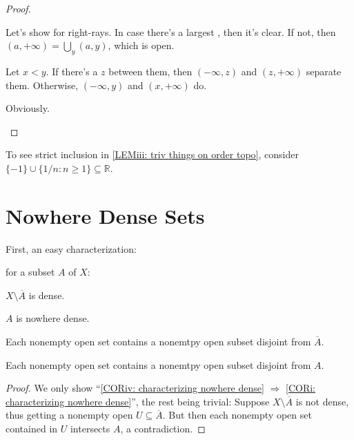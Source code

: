 	\begin{proof}
		\begin{mylist}
			\item Let's show for right-rays. In case there's a largest \elt, then it's clear. If not, then $(a, +\infty) = \bigcup_y (a, y)$, which is open.
			
			\item Let $x < y$. If there's a $z$ between them, then $(-\infty, z)$ and $(z, +\infty)$ separate them. Otherwise, $(-\infty, y)$ and $(x, +\infty)$ do.
			
			\item Obviously.\qedhere
		\end{mylist}
	\end{proof}
	
	\begin{rmk}
		To see strict inclusion in \ref{LEMiii: triv things on order topo}, consider $\{-1\}\cup\{1/n : n\ge 1\}\subseteq \mathbb R$.
	\end{rmk}




\section{Nowhere Dense Sets}

	First, an easy characterization:
	
	\begin{lem}\label{LEM: characterizing nowhere dense}
		\Tfae for a subset $A$ of $X$:
		\begin{mylist}
			\item\label{CORi: characterizing nowhere dense} $X\setminus \overline A$ is dense.
			
			\item $A$ is nowhere dense.
			
			\item Each nonempty open set contains a nonemtpy open subset disjoint from $\overline A$.
			
			\item\label{CORiv: characterizing nowhere dense} Each nonempty open set contains a nonemtpy open subset disjoint from $A$.
		\end{mylist}
	\end{lem}
	
	\begin{proof}
		We only show ``\ref{CORiv: characterizing nowhere dense} $\Rightarrow$ \ref{CORi: characterizing nowhere dense}'', the rest being trivial: Suppose $X\setminus \overline A$ is not dense, thus getting a nonempty open $U\subseteq \overline A$. But then each nonempty open set contained in $U$ intersects $A$, a contradiction.
	\end{proof}
	
